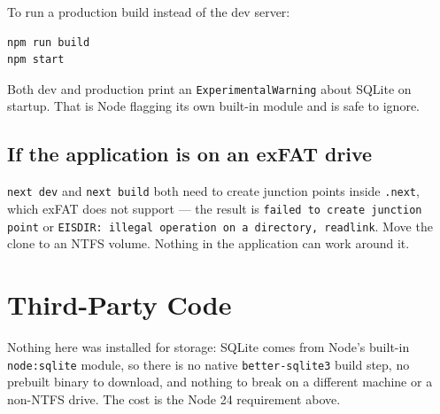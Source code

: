 \documentclass[11pt,a4paper]{article}
\begin{document}
To run a production build instead of the dev server:

\begin{lstlisting}[language=bash]
npm run build
npm start
\end{lstlisting}

Both dev and production print an \texttt{ExperimentalWarning} about SQLite on
startup. That is Node flagging its own built-in module and is safe to ignore.

\subsection{If the application is on an exFAT drive}

\texttt{next dev} and \texttt{next build} both need to create junction points
inside \texttt{.next}, which exFAT does not support --- the result is
\texttt{failed to create junction point} or \texttt{EISDIR: illegal operation on
a directory, readlink}. Move the clone to an NTFS volume. Nothing in the
application can work around it.

\section{Third-Party Code}

Nothing here was installed for storage: SQLite comes from Node's built-in
\texttt{node:sqlite} module, so there is no native \texttt{better-sqlite3} build
step, no prebuilt binary to download, and nothing to break on a different machine
or a non-NTFS drive. The cost is the Node 24 requirement above.
\end{document}
